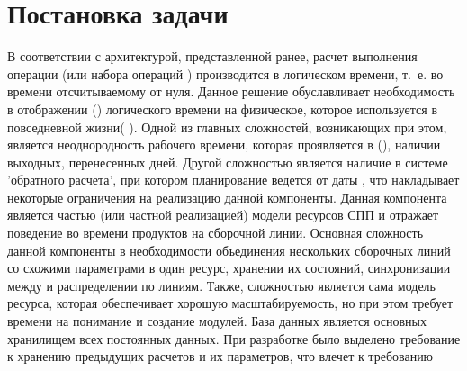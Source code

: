 \section{Постановка задачи}
В соответствии с архитектурой, представленной ранее, расчет выполнения операции
(или набора операций ) производится в логическом времени,
т.~е. во времени отсчитываемому от нуля. Данное решение обуславливает необходимость в
отображении () логического времени на физическое, 
которое используется в повседневной жизни( ).
Одной из главных сложностей, возникающих при этом, является неоднородность рабочего 
времени, которая проявляется в (), 
наличии выходных, перенесенных дней. Другой сложностью является наличие в системе 'обратного расчета', при котором планирование ведется от даты , что накладывает некоторые ограничения на реализацию данной компоненты.
Данная компонента является частью (или частной реализацией) модели ресурсов СПП и отражает поведение во времени продуктов на сборочной линии. Основная сложность данной компоненты в необходимости объединения нескольких сборочных линий со схожими параметрами в один ресурс, хранении их состояний, синхронизации между  и распределении  по линиям. Также, сложностью является сама модель ресурса, которая обеспечивает хорошую масштабируемость, но при этом требует времени на понимание и создание модулей.
База данных является основных хранилищем всех постоянных  данных. При разработке было выделено требование к хранению  предыдущих расчетов и их параметров, что влечет к требованию  
